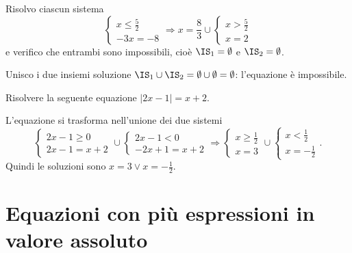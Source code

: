 \begin{exrig}
\begin{esempio}
Risolvo ciascun sistema 
\[\left\{\begin{array}{l}{x\le \frac 5 2}\\{-3x=-8}\end{array}\right.\Rightarrow x=\frac 8 3\cup \left\{\begin{array}{l}{x>\frac 5 2}\\{x=2}\end{array}\right.\] 
e verifico che entrambi sono impossibili, cioè $\IS_1=\emptyset$ e $\IS_2=\emptyset $.

Unisco i due insiemi soluzione $\IS_1\cup \IS_2=\emptyset \cup \emptyset =\emptyset $: l'equazione è impossibile.
\end{esempio}

\begin{esempio}
Risolvere la seguente equazione $\left|2x-1\right|=x+2$.

L'equazione si trasforma nell'unione dei due sistemi 
\[ \left\{\begin{array}{l}{2x-1\ge 0}\\{2x-1=x+2}\end{array}\right.\cup \left\{\begin{array}{l}{2x-1<0}\\{-2x+1=x+2}\end{array}\right.\Rightarrow
\left\{\begin{array}{l}{x\ge \frac 1 2}\\{x=3}\end{array}\right.\cup \left\{\begin{array}{l}{x<\frac 1 2}\\{x=-\frac 1 2}\end{array}\right..\] 
Quindi le soluzioni sono $x=3\vee x=-\frac 1 2$.
\end{esempio}
\end{exrig}

\section{Equazioni con più espressioni in valore assoluto}

